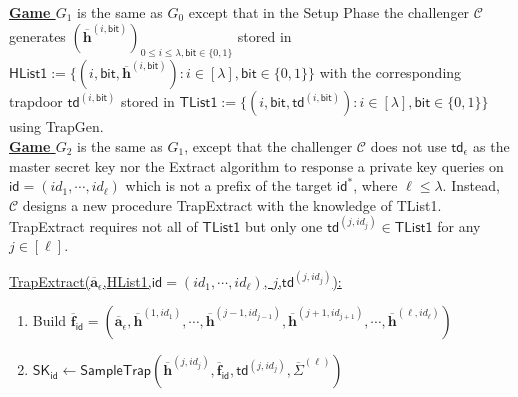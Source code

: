 \documentclass[runningheads]{llncs}
\begin{document}
\noindent\underline{\textbf{Game $G_1$}} is the same as $G_0$ except that in the Setup Phase the challenger $\mathcal{C}$ generates  $ (\overline{\textbf{h}}^{(i,\mathsf{bit})})_{0\leq i \leq \lambda, \mathsf{bit}\in \{0,1\}}$ stored in $\textsf{HList1}:=\{(i,\textsf{bit}, \overline{\textbf{h}}^{(i,\mathsf{bit})}): i \in [\lambda], \textsf{bit}\in \{0,1\} \}$ with the corresponding trapdoor $\textsf{td}^{(i, \textsf{bit})}$ stored in  $\textsf{TList1}:=\{(i,\textsf{bit}, \mathsf{td}^{(i,\mathsf{bit})}): i \in [\lambda], \textsf{bit}\in \{0,1\} \}$ using \textsf{TrapGen}.\\

\noindent\underline{\textbf{Game $G_2$}} is the same as $G_1$, except that the challenger $\mathcal{C}$ does not use $\textsf{td}_{\epsilon}$ as the master secret key nor the \textsf{Extract} algorithm to response a private key queries on $\textsf{id}=(id_1, \cdots, id_{\ell})$ which is not a prefix of the target $\textsf{id}^*$, where $\ell \leq \lambda$. Instead, $\mathcal{C}$ designs a new procedure \textsf{TrapExtract} with the knowledge of \textsf{TList1}. \textsf{TrapExtract} requires not all of $\textsf{TList1}$ but only one  $\mathsf{td}^{(j,id_{j})} \in \textsf{TList1}$ for any $j \in [\ell]$. 


\underline{\textsf{TrapExtract}($\overline{\textbf{a}}_{\epsilon}$,\textsf{HList1},$\textsf{id}=(id_1, \cdots, id_{\ell})$, $j$,$\textsf{td}^{(j,id_{j})}$):}  

\begin{enumerate}

\item Build $\overline{\mathbf{f}}_{\mathsf{id}}=(\overline{\mathbf{a}}_{\epsilon}, \overline{\mathbf{h}}^{(1,id_1)},  \cdots,\overline{\mathbf{h}}^{(j-1,id_{j-1})}, \overline{\mathbf{h}}^{(j+1,id_{j+1})}, \cdots,\overline{\mathbf{h}}^{(\ell,id_{\ell})})$
\item $\mathsf{SK}_{\textsf{id}} \leftarrow \mathsf{SampleTrap}(\overline{\mathbf{h}}^{(j,id_j)},\overline{\mathbf{f}}_{\mathsf{id}},\textsf{td}^{(j,id_{j})},\overline{\Sigma}^{(\ell)})$
\end{enumerate}
\end{document}
